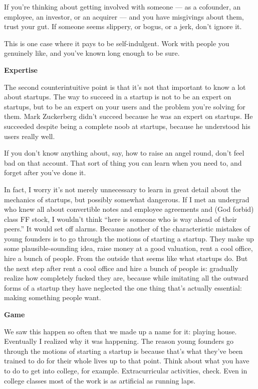 \documentclass[12pt]{book}
\begin{document}
If you're thinking about getting involved with someone --- as a
cofounder, an employee, an investor, or an acquirer --- and you have
misgivings about them, trust your gut. If someone seems slippery, or
bogus, or a jerk, don't ignore it.

This is one case where it pays to be self-indulgent. Work with people
you genuinely like, and you've known long enough to be sure.

\textbf{Expertise}

The second counterintuitive point is that it's not that important to
know a lot about startups. The way to succeed in a startup is not to be
an expert on startups, but to be an expert on your users and the problem
you're solving for them. Mark Zuckerberg didn't succeed because he was
an expert on startups. He succeeded despite being a complete noob at
startups, because he understood his users really well.

If you don't know anything about, say, how to raise an angel round,
don't feel bad on that account. That sort of thing you can learn when
you need to, and forget after you've done it.

In fact, I worry it's not merely unnecessary to learn in great detail
about the mechanics of startups, but possibly somewhat dangerous. If I
met an undergrad who knew all about convertible notes and employee
agreements and (God forbid) class FF stock, I wouldn't think ``here is
someone who is way ahead of their peers.'' It would set off alarms.
Because another of the characteristic mistakes of young founders is to
go through the motions of starting a startup. They make up some
plausible-sounding idea, raise money at a good valuation, rent a cool
office, hire a bunch of people. From the outside that seems like what
startups do. But the next step after rent a cool office and hire a bunch
of people is: gradually realize how completely fucked they are, because
while imitating all the outward forms of a startup they have neglected
the one thing that's actually essential: making something people want.

\textbf{Game}

We saw this happen so often that we made up a name for it: playing
house. Eventually I realized why it was happening. The reason young
founders go through the motions of starting a startup is because that's
what they've been trained to do for their whole lives up to that point.
Think about what you have to do to get into college, for example.
Extracurricular activities, check. Even in college classes most of the
work is as artificial as running laps.
\end{document}
